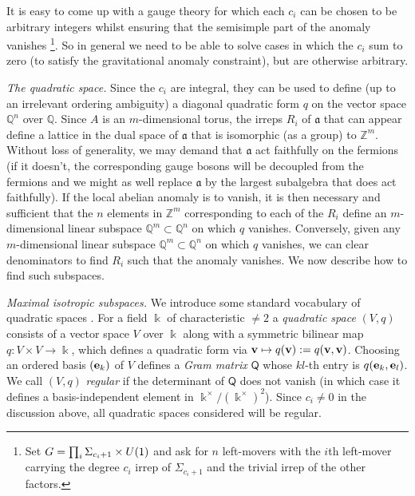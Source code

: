 \documentclass[11pt,a4paper]{article}
\begin{document}
It is easy to come up with a gauge theory for which each $c_i$ can be chosen to be arbitrary integers whilst ensuring that the semisimple part of the anomaly vanishes \footnote{Set $G=\protect\prod_i\Sigma_{c_i+1} \times U(1)$ and ask for $n$ left-movers with the $i$th left-mover carrying the degree $c_i$ irrep of $\Sigma_{c_i+1}$ and the trivial irrep of the other factors.}. So in general we need to be able to solve cases in which the $c_i$ sum to zero (to satisfy the gravitational anomaly constraint), but are otherwise arbitrary.

{\em The quadratic space.} Since the $c_i$ are integral, they can be used to define (up to an irrelevant ordering ambiguity) a diagonal quadratic form $q$ on the vector space $\mathbb{Q}^n$ over $\mathbb{Q}$. Since $A$ is an $m$-dimensional torus, the irreps $R_i$ of $\mathfrak{a}$ that can appear define a lattice in the dual space of $\mathfrak{a}$ that is isomorphic (as a group) to $\mathbb{Z}^m$.
Without loss of generality, we may demand that $\mathfrak{a}$ act faithfully on the fermions (if it doesn't, the corresponding gauge bosons will be decoupled from the fermions and we might as well replace $\mathfrak{a}$ by the largest subalgebra that does act faithfully). If the local abelian anomaly is to vanish, it is then necessary and sufficient that the $n$ elements in $\mathbb{Z}^m$ corresponding to each of the $R_i$ define an $m$-dimensional linear subspace $\mathbb{Q}^m \subset \mathbb{Q}^n$ on which $q$ vanishes. Conversely, given any $m$-dimensional linear subspace $\mathbb{Q}^m \subset \mathbb{Q}^n$ on which $q$ vanishes, we can clear denominators to find $R_i$ such that the anomaly vanishes.
We now describe how to find such subspaces.

{\em Maximal isotropic subspaces.} We introduce some standard vocabulary of quadratic spaces \cite{CasselsJ.W.S.JohnWilliamScott1978Rqf,LamT.Y.Tsit-Yuen2005Itqf,SerreJean-Pierre1973Acia}. For a field $\Bbbk$ of characteristic $\neq2$ a {\em quadratic space} $(V,q)$ consists of a vector space $V$ over $\Bbbk$ along with a symmetric bilinear map $q: V \times V \to \Bbbk$, which defines a quadratic form via $\vb{v} \mapsto q(\vb{v}):= q(\vb{v}, \vb{v})$. Choosing an ordered basis $(\vb{e}_k)$ of $V$ defines a {\em Gram matrix} $\mathsf{Q}$ whose $kl$-th entry is $q(\vb{e}_k, \vb{e}_l)$.
We call $(V,q)$ {\em regular} if the determinant of $\mathsf{Q}$ does not vanish (in which case it defines a basis-independent element in $\Bbbk^\times/(\Bbbk^\times)^2$). Since $c_i \neq 0$ in the discussion above, all quadratic spaces considered will be regular.
\end{document}
